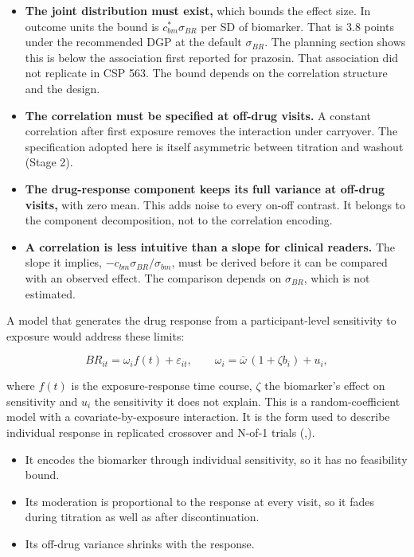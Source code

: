 \documentclass[
  11pt,
]{article}
\providecommand{\tightlist}{%
  \setlength{\itemsep}{0pt}\setlength{\parskip}{0pt}}
\begin{document}
\begin{itemize}
\tightlist
\item
  \textbf{The joint distribution must exist,} which bounds the effect size.
  In outcome units the bound is \(c_{bm}^{*}\sigma_{BR}\) per SD of
  biomarker. That is 3.8 points under the recommended DGP at the
  default \(\sigma_{BR}\). The planning section shows this is below the
  association first reported for prazosin. That association did not
  replicate in CSP 563. The bound depends on the correlation structure
  and the design.
\item
  \textbf{The correlation must be specified at off-drug visits.} A constant
  correlation after first exposure removes the interaction under
  carryover. The specification adopted here is itself asymmetric
  between titration and washout (Stage 2).
\item
  \textbf{The drug-response component keeps its full variance at off-drug
  visits,} with zero mean. This adds noise to every on-off contrast.
  It belongs to the component decomposition, not to the correlation
  encoding.
\item
  \textbf{A correlation is less intuitive than a slope for clinical
  readers.} The slope it implies, \(-c_{bm}\sigma_{BR}/\sigma_{bm}\),
  must be derived before it can be compared with an observed effect.
  The comparison depends on \(\sigma_{BR}\), which is not estimated.
\end{itemize}

A model that generates the drug response from a participant-level
sensitivity to exposure would address these limits:

\[BR_{it} = \omega_i f(t) + \varepsilon_{it}, \qquad
\omega_i = \bar\omega\,(1 + \zeta b_i) + u_i ,\]

where \(f(t)\) is the exposure-response time course, \(\zeta\) the
biomarker's effect on sensitivity and \(u_i\) the sensitivity it does
not explain. This is a random-coefficient model with a
covariate-by-exposure interaction. It is the form used to describe
individual response in replicated crossover and N-of-1 trials
(,).

\begin{itemize}
\tightlist
\item
  It encodes the biomarker through individual sensitivity, so it has
  no feasibility bound.
\item
  Its moderation is proportional to the response at every visit, so it
  fades during titration as well as after discontinuation.
\item
  Its off-drug variance shrinks with the response.
\end{itemize}
\end{document}
